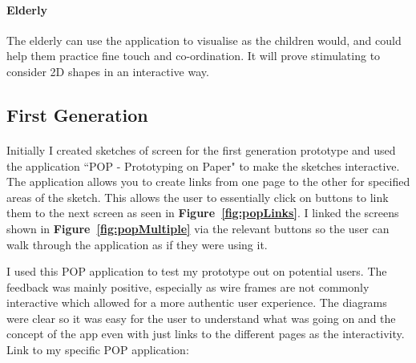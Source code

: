 \documentclass[11pt]{article}
\begin{document}
            \paragraph{Elderly}
            The elderly can use the application to visualise as the children would, and could help them practice fine touch and co-ordination. It will prove stimulating to consider 2D shapes in an interactive way. 
            \clearpage
            
            \subsection{First Generation}
                    
                \paragraph{}
                Initially I created sketches of screen for the first generation prototype and used the application ``POP - Prototyping on Paper" %
                to make the sketches interactive. The application allows you to create links from one page to the other for specified areas of the sketch. This allows the user to essentially click on buttons to link them to the next screen as seen in \textbf{Figure~\ref{fig:popLinks}}. I linked the screens shown in  \textbf{Figure~\ref{fig:popMultiple}} via the relevant buttons so the user can walk through the application as if they were using it.
                
                I used this POP application to test my prototype out on potential users. The feedback was mainly positive, especially as wire frames are not commonly interactive which allowed for a more authentic user experience. The diagrams were clear so it was easy for the user to understand what was going on and the concept of the app even with just links to the different pages as the interactivity.
                Link to my specific POP application: 
                
\end{document}
